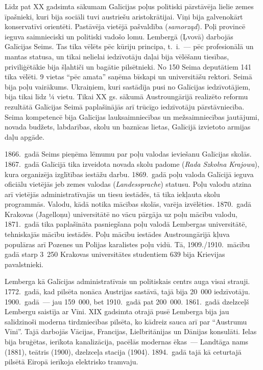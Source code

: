 \documentclass[twoside,a5paper,12pt,fleqn,openany]{extbook}
\newcommand{\pltxti}[1]{\textit{\textpolish{#1}}}
\newcommand{\detxti}[1]{\textit{\textgerman{#1}}}
\begin{document}
Līdz pat XX gadsimta sākumam Galīcijas poļus politiski pārstāvēja lielie zemes īpašnieki, kuri bija sociāli tuvi austriešu aristokrātijai. Viņi bija galvenokārt konservatīvi orientēti. Pastāvēja vietējā pašvaldība (\pltxti{samorząd}). Poļi provincē ieguva saimnieciski un politiski vadošo lomu. Lembergā (Ļvovā) darbojās Galīcijas Seims. Tas tika vēlēts pēc kūriju principa, t.~i.~--- pēc profesionālā un mantas statusa, un tikai nelielai iedzīvotāju daļai bija vēlēšanu tiesības, priviliģētākie bija šļahtiči un bagātie pilsētnieki. No 150 Seima deputātiem 141 tika vēlēti. 9 vietas ``pēc amata'' saņēma bīskapi un universitāšu rektori. Seimā bija poļu vairākums. Ukraiņiem, kuri sastādīja pusi no Galīcijas iedzīvotājiem, bija tikai līdz ¼ vietu. Tikai XX gs. sākumā Austroungārijā realizēto reformu rezultātā Galīcijas Seimā paplašinājās arī trūcīgo iedzīvotāju pārstāvniecība. Seima kompetencē bija Galīcijas lauksaimniecības un mežsaimniecības jautājumi, novada budžets, labdarības, skolu un baznīcas lietas, Galīcijā izvietoto armijas daļu apgāde.

1866.~gadā Seims pieņēma lēmumu par poļu valodas ieviešanu Galīcijas skolās. 1867.~gadā Galīcijā tika izveidota novada skolu padome (\pltxti{Rada Szkolna Krajowa}), kura organizēja izglītības iestāžu darbu. 1869.~gadā poļu valoda Galīcijā ieguva oficiālu vietējās jeb zemes valodas (\detxti{Landessprache}) statusu. Poļu valodu atzina arī vietējās administratīvajās un tiesu iestādēs, tā tika iekļauta skolu programmās. Valodu, kādā notika mācības skolās, varēja izvēlēties. 1870.~gadā Krakovas (Jagelloņu) universitātē no vācu pārgāja uz poļu mācību valodu, 1871.~gadā tika paplašināta pasniegšana poļu valodā Lembergas universitātē, tehniskajās mācību iestādēs. Poļu mācību iestādes Austroungārijā kļuva populāras arī Pozenes un Polijas karalistes poļu vidū. Tā, 1909./1910.~mācību gadā starp 3~250 Krakovas universitātes studentiem 639 bija Krievijas pavalstnieki.

Lemberga kā Galīcijas administratīvais un politiskais centrs auga visai strauji. 1772.~gadā, kad pilsēta nonāca Austrijas sastāvā, tajā bija 20~000 iedzīvotāju. 1900.~gadā~--- jau 159~000, bet 1910.~gadā pat 200~000. 1861.~gadā dzelzceļš Lembergu saistīja ar Vīni. XIX gadsimta otrajā pusē Lemberga bija jau salīdzinoši moderna tirdzniecības pilsēta, ko kādreiz sauca arī par ``Austrumu Vīni''. Tajā darbojās Vācijas, Francijas, Lielbritānijas un Dānijas konsulāti. Ielas bija bruģētas, ierīkota kanalizācija, pacēlās modernas ēkas~--- Landtāga nams (1881), teātris (1900), dzelzceļa stacija (1904). 1894.~gadā tajā kā ceturtajā pilsētā Eiropā ierīkoja elektrisko tramvaju.
\end{document}
